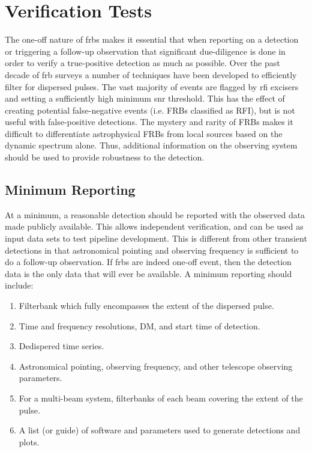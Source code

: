 \documentclass[a4paper,fleqn,usenatbib]{mnras}
\begin{document}
\section{Verification Tests}


The one-off nature of \glspl{frb} makes it essential that when reporting on a
detection or triggering a follow-up observation that significant due-diligence
is done in order to verify a true-positive detection as much as possible. Over the
past decade of \gls{frb} surveys a number of techniques have been developed to
efficiently filter for dispersed pulses. The vast majority of events are flagged
by \gls{rfi} excisers and setting a sufficiently high minimum \gls{snr}
threshold. This has the effect of creating potential false-negative events (i.e.
FRBs classified as RFI), but is not useful with false-positive detections. The
mystery and rarity of FRBs makes it difficult to differentiate astrophysical FRBs
from local sources based on the dynamic spectrum alone. Thus, additional
information on the observing system should be used to provide robustness to the
detection.

\subsection{Minimum Reporting}

At a minimum, a reasonable detection should be reported with the observed data
made publicly available.  This allows independent verification, and can be used
as input data sets to test pipeline development.  This is different from other
transient detections in that astronomical pointing and observing frequency is
sufficient to do a follow-up observation. If \glspl{frb} are indeed one-off
event, then the detection data is the only data that will ever be available. A
minimum reporting should include:

\begin{enumerate}
    \item Filterbank which fully encompasses the extent of the dispersed pulse.
    \item Time and frequency resolutions, DM, and start time of detection.
    \item Dedispered time series.
    \item Astronomical pointing, observing frequency, and other telescope
    observing parameters.
    \item For a multi-beam system, filterbanks of each beam covering the extent
    of the pulse.
    \item A list (or guide) of software and parameters used to generate
    detections and plots.
\end{enumerate}
\end{document}
